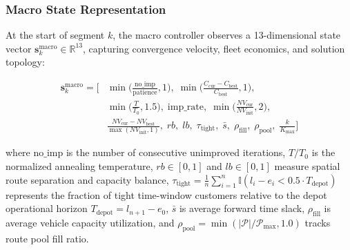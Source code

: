 \documentclass{ieeeaccess}
\begin{document}
\subsubsection{Macro State Representation}
At the start of segment $k$, the macro controller observes a 13-dimensional state vector $\mathbf{s}_k^{\text{macro}} \in \mathbb{R}^{13}$, capturing convergence velocity, fleet economics, and solution topology:

\begin{align}  \mathbf{s}_k^{\text{macro}} = \Big[ 
    &\min\Big(\frac{\text{no\_imp}}{\text{patience}}, 1\Big), \;
    \min\Big(\frac{C_{\text{cur}} - C_{\text{best}}}{C_{\text{best}}}, 1\Big), \nonumber \\
    &\min\Big(\frac{T}{T_0}, 1.5\Big), \;
    \text{imp\_rate}, \;
    \min\Big(\frac{NV_{\text{cur}}}{NV_{\text{init}}}, 2\Big), \nonumber \\
    &\frac{NV_{\text{cur}} - NV_{\text{best}}}{\max(NV_{\text{init}}, 1)}, \;
    rb, \; lb, \; \tau_{\text{tight}}, \; \bar{s}, \; \rho_{\text{fill}}, \; \rho_{\text{pool}}, \; \frac{k}{K_{\max}}
  \Big]
  \label{eq:macro_state}
\end{align}

where $\text{no\_imp}$ is the number of consecutive unimproved iterations, $T/T_0$ is the normalized annealing temperature, $rb \in [0, 1]$ and $lb \in [0, 1]$ measure spatial route separation and capacity balance, $\tau_{\text{tight}} = \frac{1}{n}\sum_{i=1}^n \mathbb{I}(l_i - e_i < 0.5 \cdot T_{\text{depot}})$ represents the fraction of tight time-window customers relative to the depot operational horizon $T_{\text{depot}} = l_{n+1} - e_0$, $\bar{s}$ is average forward time slack, $\rho_{\text{fill}}$ is average vehicle capacity utilization, and $\rho_{\text{pool}} = \min(|\mathcal{P}|/\mathcal{P}_{\max}, 1.0)$ tracks route pool fill ratio.
\end{document}

